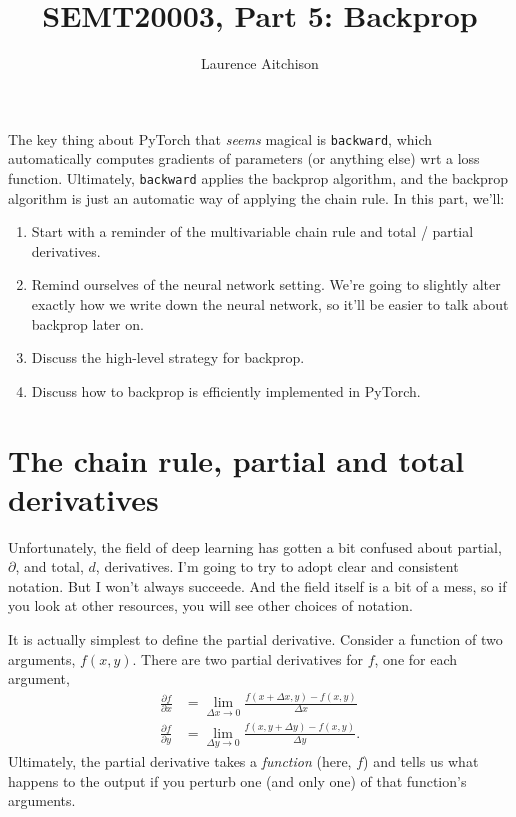 \documentclass{article}
\title{SEMT20003, Part 5: Backprop}
\author{Laurence Aitchison}
\date{}
\newcommand{\dd}[2][]{\frac{\partial #1}{\partial #2}}
\begin{document}
\maketitle

The key thing about PyTorch that \textit{seems} magical is \verb|backward|, which automatically computes gradients of parameters (or anything else) wrt a loss function.
Ultimately, \verb|backward| applies the backprop algorithm, and the backprop algorithm is just an automatic way of applying the chain rule.  
In this part, we'll:
\begin{enumerate}
  \item Start with a reminder of the multivariable chain rule and total / partial derivatives.
  \item Remind ourselves of the neural network setting. We're going to slightly alter exactly how we write down the neural network, so it'll be easier to talk about backprop later on.
  \item Discuss the high-level strategy for backprop.
  \item Discuss how to backprop is efficiently implemented in PyTorch.
\end{enumerate}

\section{The chain rule, partial and total derivatives}

Unfortunately, the field of deep learning has gotten a bit confused about partial, $\partial$, and total, $d$, derivatives.
I'm going to try to adopt clear and consistent notation.
But I won't always succeede.  
And the field itself is a bit of a mess, so if you look at other resources, you will see other choices of notation.

It is actually simplest to define the partial derivative.  Consider a function of two arguments, $f(x, y)$.
There are two partial derivatives for $f$, one for each argument,
\begin{subequations}
\begin{align}
  \label{eq:ddfx}
  \dd[f]{x} &= \lim_{\Delta x \rightarrow 0} \frac{f(x + \Delta x, y) - f(x, y)}{\Delta x}\\
  \label{eq:ddfy}
  \dd[f]{y} &= \lim_{\Delta y \rightarrow 0} \frac{f(x, y + \Delta y) - f(x, y)}{\Delta y}.
\end{align}
\end{subequations}
Ultimately, the partial derivative takes a \textit{function} (here, $f$) and tells us what happens to the output if you perturb one (and only one) of that function's arguments.
\end{document}

